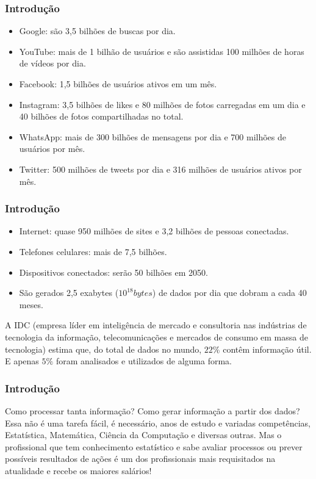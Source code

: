 \documentclass[14pt,aspectratio=1610]{beamer}
\begin{document}
\begin{frame}{}
\frametitle{Introdução}
\begin{block}{}
\justifying
\begin{itemize}
\item Google: são 3,5 bilhões de buscas por dia.\pause
\item YouTube: mais de 1 bilhão de usuários e são assistidas 100 milhões de horas de vídeos por dia.\pause
\item Facebook: 1,5 bilhões de usuários ativos em um mês.\pause
\item Instagram: 3,5 bilhões de likes e 80 milhões de fotos carregadas em um dia e 40 bilhões de fotos compartilhadas no total.\pause
\item WhatsApp: mais de 300 bilhões de mensagens por dia e 700 milhões de usuários por mês.\pause
\item Twitter: 500 milhões de tweets por dia e 316 milhões de usuários ativos por mês.
\end{itemize}
\end{block}
\end{frame}

\begin{frame}{}
\frametitle{Introdução}
\begin{block}{}
\justifying
\begin{itemize}
\item Internet: quase 950 milhões de sites e 3,2 bilhões de pessoas conectadas.\pause
\item Telefones celulares: mais de 7,5 bilhões.\pause
\item Dispositivos conectados: serão 50 bilhões em 2050.\pause
\item São gerados 2,5 exabytes ($10^{18} bytes$) de dados por dia que dobram a cada 40 meses.
\end{itemize}
\end{block}
\begin{block}{}
\justifying
A IDC (empresa líder em inteligência de mercado e consultoria nas indústrias de tecnologia da informação, telecomunicações e mercados de consumo em massa de tecnologia) estima que, do total de dados no mundo, $22\%$ contêm informação útil. E apenas $5\%$ foram analisados e utilizados de alguma forma. \cite{exame14}
\end{block}
\end{frame}

\begin{frame}{}
\frametitle{Introdução}
\begin{block}{}
\justifying
Como processar tanta informação? Como gerar informação a partir dos dados? Essa não é uma tarefa fácil, é necessário, anos de estudo e variadas competências, Estatística, Matemática, Ciência da Computação e diversas outras. Mas o profissional que tem conhecimento estatístico e sabe avaliar processos ou prever possíveis resultados de ações é um dos profissionais mais requisitados na atualidade e recebe os maiores salários!
\end{block}
\end{frame}
\end{document}
